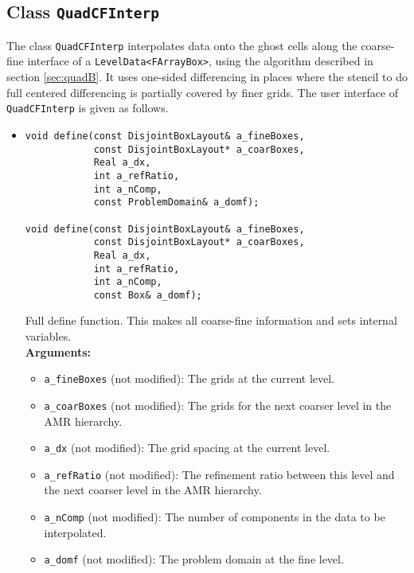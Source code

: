 \subsection{Class {\tt QuadCFInterp}}

The class {\tt QuadCFInterp} interpolates data onto
the ghost cells along the coarse-fine interface of a
\verb/LevelData<FArrayBox>/, using the algorithm described in section
\ref{sec:quadB}.  It uses one-sided  differencing in places where the
stencil to do full centered differencing is partially covered by
finer grids. The user interface of {\tt QuadCFInterp} is given as
follows. 

\begin{itemize}

\item
\begin{verbatim} 
void define(const DisjointBoxLayout& a_fineBoxes,
            const DisjointBoxLayout* a_coarBoxes,
            Real a_dx, 
            int a_refRatio,
            int a_nComp,
            const ProblemDomain& a_domf);

void define(const DisjointBoxLayout& a_fineBoxes,
            const DisjointBoxLayout* a_coarBoxes,
            Real a_dx, 
            int a_refRatio,
            int a_nComp,
            const Box& a_domf);
\end{verbatim}
Full define function. This makes all coarse-fine information and sets
internal variables.
\\ {\bf Arguments:} 
  \begin{itemize}
  \item
  \verb/a_fineBoxes/ (not modified):
  The grids at the current level.
  \item
  \verb/a_coarBoxes/ (not modified):
  The grids for the next coarser level in the AMR hierarchy.
  \item
  \verb/a_dx/ (not modified):
  The grid spacing at the current level.
  \item
  \verb/a_refRatio/ (not modified):
  The refinement ratio between this level and the next coarser level in the
  AMR hierarchy.
  \item
  \verb/a_nComp/ (not modified):
  The number of components in the data to be interpolated.
  \item \verb/a_domf/ (not modified):
  The problem domain at the fine level.
  \end{itemize}


\end{itemize}
